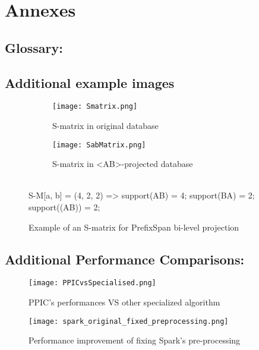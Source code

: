 \documentclass{eplmastersthesis}
\begin{document}
\clearpage
\nocite{*}



\clearpage
\section{Annexes}

\subsection{Glossary:}

\vspace*{-1.8cm}
\glsaddall
\printglossary[title=,type=\acronymtype]

\subsection{Additional example images}

\begin{figure*}[h]
  \centering
  \begin{subfigure}[t]{0.5\textwidth}
  	\centering
    \texttt{[image: Smatrix.png]}
    \caption{S-matrix in original database}
  \end{subfigure}
  \begin{subfigure}[t]{0.49\textwidth}
  	\centering
    \texttt{[image: SabMatrix.png]}
    \caption{S-matrix in <AB>-projected database}
  \end{subfigure}
  \vspace{5px} \\
  S-M[a, b] = (4, 2, 2) => support(AB) = 4; support(BA) = 2; support((AB)) = 2;
  \caption{Example of an S-matrix for PrefixSpan bi-level projection}
  \label{fig:smatrix}
\end{figure*}

\subsection{Additional Performance Comparisons:}

\begin{figure}[h]
  \centering
  \texttt{[image: PPICvsSpecialised.png]}
  \caption{PPIC's performances VS other specialized algorithm}
  \label{fig:PPICvsOther}
\end{figure}

\begin{figure}[h]
  \centering
  \texttt{[image: spark\_original\_fixed\_preprocessing.png]}
  \caption{Performance improvement of fixing Spark's pre-processing}
  \label{fig:spark_preprocessing_fix}
\end{figure}
\end{document}
